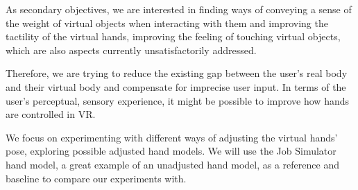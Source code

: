 
As secondary objectives, we are interested in finding ways of conveying a sense of the weight of virtual objects when interacting with them and improving the tactility of the virtual hands, improving the feeling of touching virtual objects, which are also aspects currently unsatisfactorily addressed.

Therefore, we are trying to reduce the existing gap between the user's real body and their virtual body and compensate for imprecise user input. In terms of the user's perceptual, sensory experience, it might be possible to improve how hands are controlled in VR.

We focus on experimenting with different ways of adjusting the virtual hands' pose, exploring possible adjusted hand models. We will use the Job Simulator hand model, a great example of an unadjusted hand model, as a reference and baseline to compare our experiments with.